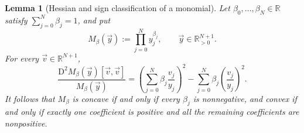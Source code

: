 \documentclass[aps,pra,11pt,onecolumn,nofootinbib,tightenlines]{revtex4-2}
\newtheorem{lemma}[theorem]{Lemma}
\theoremstyle{definition}
\begin{document}
\begin{lemma}[Hessian and sign classification of a monomial]
\label{lem:app-monomial-hessian}
Let $\beta_0,\ldots,\beta_N\in\mathbb R$ satisfy $\sum_{j=0}^N\beta_j=1$, and put
\begin{equation}
 M_\beta(\vec y):=\prod_{j=0}^N y_j^{\beta_j},
 \qquad \vec y\in\mathbb R_{>0}^{N+1}.
 \label{eq:app-M-beta}
\end{equation}
For every $\vec v\in\mathbb R^{N+1}$,
\begin{equation}
 \frac{\mathrm D^2M_\beta(\vec y)[\vec v,\vec v]}{M_\beta(\vec y)}
 =\left(\sum_{j=0}^N\beta_j\frac{v_j}{y_j}\right)^2
 -\sum_{j=0}^N\beta_j\left(\frac{v_j}{y_j}\right)^2.
 \label{eq:app-monomial-Hessian}
\end{equation}
It follows that $M_\beta$ is concave if and only if every $\beta_j$ is nonnegative, and convex if and only if exactly one coefficient is positive and all the remaining coefficients are nonpositive.
\end{lemma}
\end{document}
